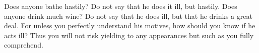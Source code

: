 Does anyone bathe hastily? Do not say that he does it ill, but hastily.
Does anyone drink much wine? Do not say that he does ill, but that he
drinks a great deal. For unless you perfectly understand his motives, how
should you know if he acts ill? Thus you will not risk yielding to any
appearances but such as you fully comprehend.
